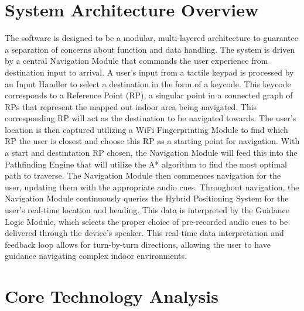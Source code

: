 \documentclass{article}
\begin{document}
\section{System Architecture Overview}
The software is designed to be a modular, multi-layered architecture to guarantee a separation of concerns about function and data handling. The system is driven by a central Navigation Module that commands the user experience from destination input to arrival. A user's input from a tactile keypad is processed by an Input Handler to select a destination in the form of a keycode. This keycode corresponds to a Reference Point (RP), a singular point in a connected graph of RPs that represent the mapped out indoor area being navigated. This corresponding RP will act as the destination to be navigated towards. The user's location is then captured utilizing a WiFi Fingerprinting Module to find which RP the user is closest and choose this RP as a starting point for navigation. With a start and destintation RP chosen, the Navigation Module will feed this into the Pathfinding Engine that will utilize the A* algorithm to find the most optimal path to traverse. The Navigation Module then commences navigation for the user, updating them with the appropriate audio cues. Throughout navigation, the Navigation Module continuously queries the Hybrid Positioning System for the user's real-time location and heading. This data is interpreted by the Guidance Logic Module, which selects the proper choice of pre-recorded audio cues to be delivered through the device's speaker. This real-time data interpretation and feedback loop allows for turn-by-turn directions, allowing the user to have guidance navigating complex indoor environments.

\section{Core Technology Analysis}
\end{document}
